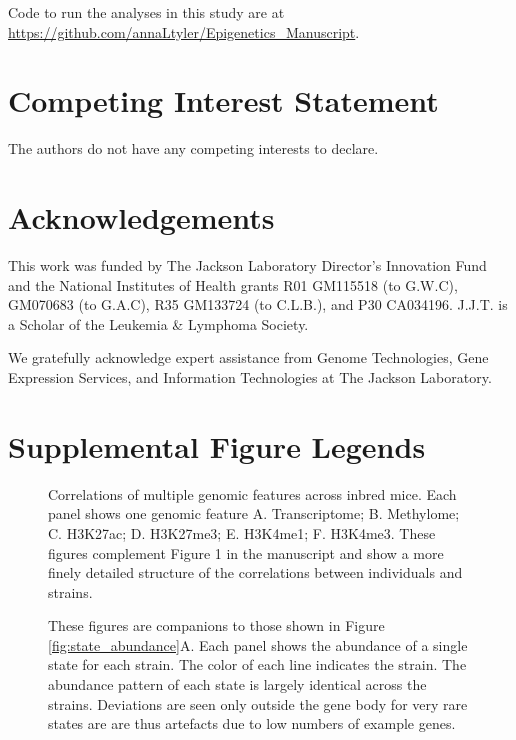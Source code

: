 \documentclass[
  11pt,
]{article}
\newcommand{\beginsupplement}{%
        \setcounter{table}{0}
        \renewcommand{\thetable}{S\arabic{table}}%
        \setcounter{figure}{0}
        \renewcommand{\thefigure}{S\arabic{figure}}%
     }
\begin{document}
Code to run the analyses in this study are at
\url{https://github.com/annaLtyler/Epigenetics_Manuscript}.

\hypertarget{competing-interest-statement}{%
\section{Competing Interest
Statement}\label{competing-interest-statement}}

The authors do not have any competing interests to declare.

\hypertarget{acknowledgements}{%
\section{Acknowledgements}\label{acknowledgements}}

This work was funded by The Jackson Laboratory Director's Innovation
Fund and the National Institutes of Health grants R01 GM115518 (to
G.W.C), GM070683 (to G.A.C), R35 GM133724 (to C.L.B.), and P30 CA034196.
J.J.T. is a Scholar of the Leukemia \& Lymphoma Society.

We gratefully acknowledge expert assistance from Genome Technologies,
Gene Expression Services, and Information Technologies at The Jackson
Laboratory.

\pagebreak

\hypertarget{supplemental-figure-legends}{%
\section{Supplemental Figure
Legends}\label{supplemental-figure-legends}}

\beginsupplement

\begin{figure}[ht!]
\caption{Correlations of multiple genomic features across inbred
mice. Each panel shows one genomic feature A. Transcriptome;
B. Methylome; C. H3K27ac; D. H3K27me3; E. H3K4me1; F. H3K4me3.
These figures complement Figure 1 in the manuscript and show
a more finely detailed structure of the correlations between
individuals and strains.
}
\label{supp_fig:feature_correlation}
\end{figure}

\begin{figure}[ht!]
\caption{These figures are companions to those shown in Figure 
\ref{fig:state_abundance}A. Each panel shows the abundance of 
a single state for each strain. The color of each line indicates 
the strain. The abundance pattern of each state is largely identical 
across the strains. Deviations are seen only outside the gene body
for very rare states are are thus artefacts due to low numbers
of example genes.
}
\label{supp_fig:state_abundance_by_strain}
\end{figure}
\end{document}
